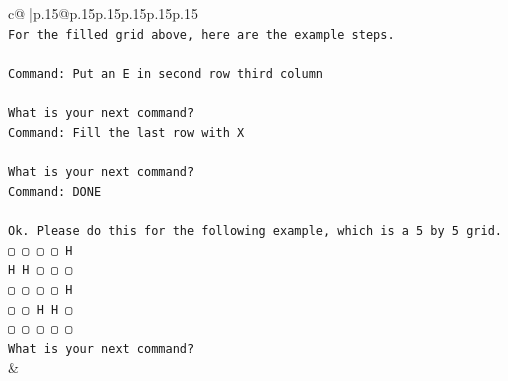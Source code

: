 \documentclass{article}
\begin{document}
{\begin{supertabular}{c@{$\;$}|p{.15\linewidth}@{}p{.15\linewidth}p{.15\linewidth}p{.15\linewidth}p{.15\linewidth}p{.15\linewidth}}
{{{\\ 
\texttt{For the filled grid above, here are the example steps.} \\
\\ 
\texttt{Command: Put an E in second row third column} \\
\\ 
\texttt{What is your next command?} \\
\texttt{Command: Fill the last row with X} \\
\\ 
\texttt{What is your next command?} \\
\texttt{Command: DONE} \\
\\ 
\texttt{Ok. Please do this for the following example, which is a 5 by 5 grid.} \\
\texttt{▢ ▢ ▢ ▢ H} \\
\texttt{H H ▢ ▢ ▢} \\
\texttt{▢ ▢ ▢ ▢ H} \\
\texttt{▢ ▢ H H ▢} \\
\texttt{▢ ▢ ▢ ▢ ▢} \\
\texttt{What is your next command?} \\
            }
        }
    }
    & \\ \\


\end{supertabular}}
\end{document}
